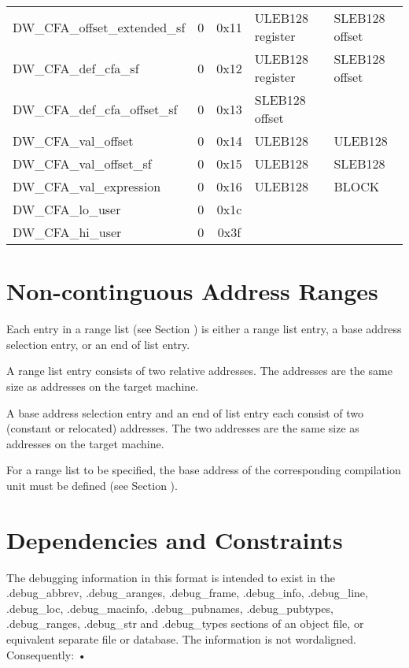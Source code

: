 \begin{centering}
\begin{longtable}{l|c|c|l|l}
DW\_CFA\_offset\_extended\_sf&0&0x11&ULEB128 register&SLEB128 offset \\
DW\_CFA\_def\_cfa\_sf&0&0x12&ULEB128 register&SLEB128 offset \\
DW\_CFA\_def\_cfa\_offset\_sf&0&0x13&SLEB128 offset & \\
DW\_CFA\_val\_offset&0&0x14&ULEB128&ULEB128 \\
DW\_CFA\_val\_offset\_sf&0&0x15&ULEB128&SLEB128 \\
DW\_CFA\_val\_expression&0&0x16&ULEB128&BLOCK  \\
DW\_CFA\_lo\_user&0&0x1c   & & \\
DW\_CFA\_hi\_user&0&0x3f & & \\
\end{longtable}
\end{centering}

\section{Non-continguous Address Ranges}
\label{datarep:noncontiguousaddressranges}

Each entry in a range list 
(see Section )
is either a
range list entry, a base address selection entry, or an end
of list entry.

A range list entry consists of two relative addresses. The
addresses are the same size as addresses on the target machine.

A base address selection entry and an end of list entry each
consist of two (constant or relocated) addresses. The two
addresses are the same size as addresses on the target machine.

For a range list to be specified, the base address of the
corresponding compilation unit must be defined 
(see Section ).


\section{Dependencies and Constraints}
\label{datarep:dependenciesandconstraints}

The debugging information in this format is intended to
exist in the .debug\_abbrev, .debug\_aranges, .debug\_frame,
.debug\_info, .debug\_line, .debug\_loc, .debug\_macinfo,
.debug\_pubnames, .debug\_pubtypes, .debug\_ranges, .debug\_str
and .debug\_types sections of an object file, or equivalent
separate file or database. The information is not 
word\dash aligned. Consequently: •

